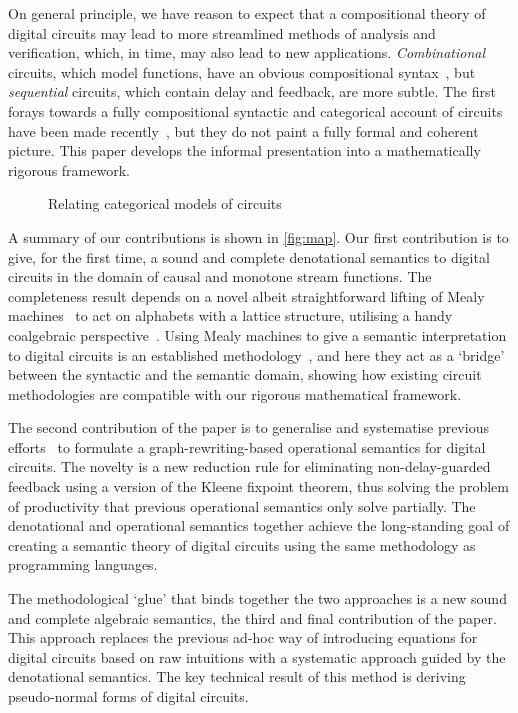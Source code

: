 \documentclass{lmcs}
\begin{document}
On general principle, we have reason to expect that a compositional theory of
digital circuits may lead to more streamlined methods of analysis and
verification, which, in time, may also lead to new applications.
\emph{Combinational} circuits, which model functions, have an obvious
compositional syntax~\cite{lafont2003algebraic}, but \emph{sequential} circuits,
which contain delay and feedback, are more subtle.
The first forays towards a fully compositional syntactic and
categorical account of circuits have been made
recently~\cite{ghica2016categorical,ghica2017diagrammatic}, but they do not
paint a fully formal and coherent picture.
This paper develops the informal presentation into a mathematically
rigorous framework.

\begin{figure}
    \centering
    
    \caption{Relating categorical models of circuits}
    \label{fig:map}
\end{figure}

A summary of our contributions is shown in \autoref{fig:map}.
Our first contribution is to give, for the first time, a sound and complete
denotational semantics to digital circuits in the domain of causal and monotone
stream functions.
The completeness result depends on a novel albeit straightforward lifting of
Mealy machines~\cite{mealy1955method} to act on alphabets with a lattice
structure, utilising a handy coalgebraic perspective~\cite{rutten2006algebraic}.
Using Mealy machines to give a semantic interpretation to digital circuits is an
established methodology~\cite{kohavi2009switching}, and here they act as a
`bridge' between the syntactic and the semantic domain, showing how existing
circuit methodologies are compatible with our rigorous mathematical framework.

The second contribution of the paper is to generalise and systematise previous
efforts~\cite{ghica2017diagrammatic} to formulate a graph-rewriting-based
operational semantics for digital circuits.
The novelty is a new reduction rule for eliminating non-delay-guarded feedback
using a version of the Kleene fixpoint theorem, thus solving the problem of
productivity that previous operational semantics only solve partially.
The denotational and operational semantics together achieve the long-standing
goal of creating a semantic theory of digital circuits using the same
methodology as programming languages.

The methodological `glue' that binds together the two approaches is a new sound
and complete algebraic semantics, the third and final contribution of the paper.
This approach replaces the previous ad-hoc way of introducing equations for
digital circuits based on raw intuitions with a systematic approach guided by
the denotational semantics.
The key technical result of this method is deriving pseudo-normal forms of
digital circuits.
\end{document}
